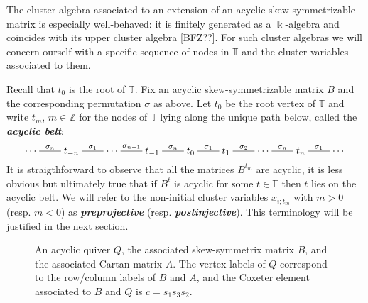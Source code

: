 \documentclass[12pt]{amsart}
\newcommand{\newword}[1]{\textbf{\emph{#1}}}
\newcommand{\TT}{\mathbb{T}}
\newcommand{\ZZ}{\mathbb{Z}}
\newcommand{\kk}{\Bbbk}%
\newcommand{\dashname}[1]{\stackrel{#1}{\begin{picture}(22,3)\put(0,2.5){\line(1,0){22}}\end{picture}}}
\theoremstyle{remark}
\numberwithin{equation}{section}
\begin{document}
The cluster algebra associated to an extension of an acyclic skew-symmetrizable matrix is especially well-behaved: it is finitely generated as a $\kk$-algebra and coincides with its upper cluster algebra [BFZ??].
For such cluster algebras we will concern ourself with a specific sequence of nodes in $\TT$ and the cluster variables associated to them.

Recall that $t_0$ is the root of $\TT$.  Fix an acyclic skew-symmetrizable matrix $B$ and the corresponding permutation $\sigma$ as above.  Let $t_0$ be the root vertex of $\TT$ and write $t_m$, $m\in\ZZ$ for the nodes of $\TT$ lying along the unique path below, called the \newword{acyclic belt}:
\begin{equation}
  \cdots
  \dashname{\sigma_n}
  t_{-n}
  \dashname{\sigma_1}
  \cdots
  \dashname{\sigma_{n-1}}
  t_{-1}
  \dashname{\sigma_n}
  t_0
  \dashname{\sigma_1}
  t_1
  \dashname{\sigma_2}
  \cdots
  \dashname{\sigma_n}
  t_n
  \dashname{\sigma_1}
  \cdots
\end{equation}
It is straigthforward to observe that all the matrices $B^{t_m}$ are acyclic, it is less obvious but ultimately true that if $B^t$ is acyclic for some $t\in\TT$ then $t$ lies on the acyclic belt.
We will refer to the non-initial cluster variables $x_{i;t_m}$ with $m>0$ (resp. $m<0$) as \newword{preprojective} (resp. \newword{postinjective}).
This terminology will be justified in the next section.

\begin{figure}
\centering
{}
\caption{An acyclic quiver $Q$, the associated skew-symmetrix matrix $B$, and the associated Cartan matrix $A$. The vertex labels of $Q$ correspond to the row/column labels of $B$ and $A$, and the Coxeter element associated to $B$ and $Q$ is $c = s_1 s_3 s_2$.}\label{fig:matrices}
\end{figure}  
\end{document}
